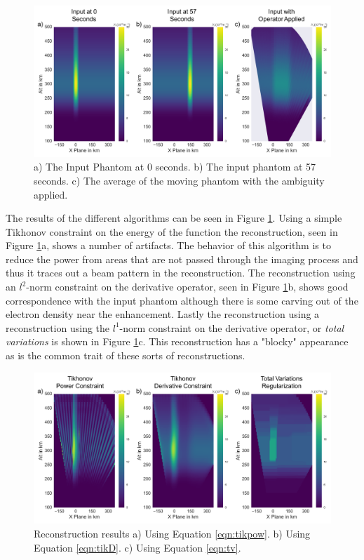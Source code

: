 \begin{figure}[!ht]
\centering
\includegraphics[width=6in]{Simpleinputfast}
\caption{a) The Input Phantom at 0 seconds. b) The input phantom at 57 seconds. c) The average of the moving phantom with the ambiguity applied.}
\label{fig:simpinputfast}
\end{figure}

The results of the different algorithms can be seen in Figure \ref{fig:simpinputfast}. Using a simple Tikhonov constraint on the energy of the function the reconstruction, seen in Figure \ref{fig:simpinputfast}a, shows a number of artifacts. The behavior of this algorithm is to reduce the power from areas that are not passed through the imaging process and thus it traces out a beam pattern in the reconstruction. The reconstruction using an $l^2$-norm constraint on the derivative operator, seen in Figure \ref{fig:simpinputfast}b, shows good correspondence with the input phantom although there is some carving out of the electron density near the enhancement. Lastly the reconstruction using a reconstruction using the $l^1$-norm constraint on the derivative operator, or \textit{total variations} is shown in Figure \ref{fig:simpinputfast}c. This reconstruction has a "blocky" appearance as is the common trait of these sorts of reconstructions.

\begin{figure}[!ht]
\centering
\includegraphics[width=6in]{Simpleinvertedfaster}
\caption{Reconstruction results a) Using Equation \ref{eqn:tikpow}.  b) Using Equation \ref{eqn:tikD}. c) Using Equation \ref{eqn:tv}.}
\label{fig:simpoutputfast}
\end{figure}

